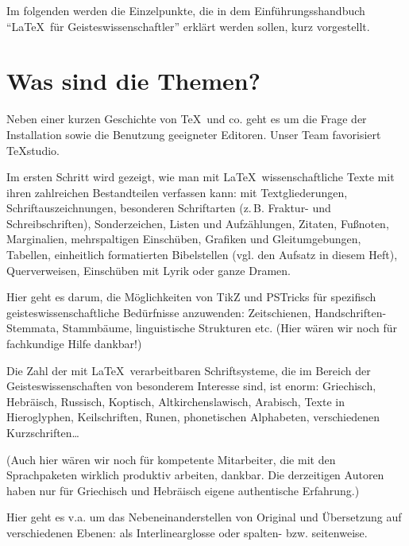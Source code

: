 \documentclass[ngerman]{dtk}
\begin{document}
Im folgenden werden die Einzelpunkte, die in dem Einführungsshandbuch \enquote{\LaTeX\ für Geisteswissenschaftler}
erklärt werden sollen, kurz vorgestellt.


\section{Was sind die Themen?}



Neben einer kurzen Geschichte von \TeX\ und co. geht es um die Frage der Installation sowie die Benutzung 
geeigneter Editoren.
Unser Team favorisiert TeXstudio.


Im ersten Schritt wird gezeigt, wie man mit \LaTeX\ wissenschaftliche Texte mit ihren zahlreichen Bestandteilen
verfassen kann: mit Textgliederungen, Schriftauszeichnungen, besonderen Schriftarten (z.\,B. Fraktur- und
Schreibschriften), Sonderzeichen, Listen und Aufzählungen, Zitaten, Fußnoten, Marginalien, mehrspaltigen
Einschüben, Grafiken und Gleitumgebungen, Tabellen, einheitlich formatierten Bibelstellen (vgl. den Aufsatz
in diesem Heft), Querverweisen, Einschüben mit Lyrik oder ganze Dramen.  


Hier geht es darum, die Möglichkeiten von TikZ und PSTricks für spezifisch geisteswissenschaftliche
Bedürfnisse anzuwenden: Zeitschienen, Handschriften-Stemmata, Stammbäume, linguistische Strukturen etc.
(Hier wären wir noch für fachkundige Hilfe dankbar!)


Die Zahl der mit \LaTeX\ verarbeitbaren Schriftsysteme, die im Bereich der Geisteswissenschaften von besonderem 
Interesse sind, ist enorm:
Griechisch,
Hebräisch,
Russisch,
Koptisch,
Altkirchenslawisch,
Arabisch,
Texte in Hieroglyphen,
Keilschriften,
Runen,
phonetischen Alphabeten,
verschiedenen Kurzschriften\ldots

(Auch hier wären wir noch für kompetente Mitarbeiter, die mit den Sprachpaketen wirklich produktiv 
arbeiten, dankbar. Die derzeitigen Autoren haben nur für Griechisch und Hebräisch eigene authentische 
Erfahrung.)


Hier geht es v.a. um das Nebeneinanderstellen von Original und Übersetzung auf verschiedenen Ebenen:
als Interlinearglosse oder spalten- bzw. seitenweise.
\end{document}

